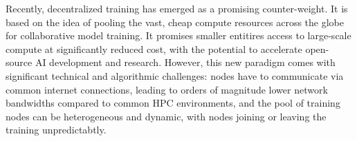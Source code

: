 \documentclass[conference, 10pt]{IEEEtran}
\begin{document}

Recently, decentralized training has emerged as a promising counter-weight. It
is based on the idea of pooling the vast, cheap compute resources across the
globe for collaborative model training. It promises smaller entitires access to
large-scale compute at significantly reduced cost, with the potential to
accelerate open-source AI development and research. However, this new paradigm
comes with significant technical and algorithmic challenges: nodes have to
communicate via common internet connections, leading to orders of magnitude
lower network bandwidths compared to common HPC environments, and the pool of
training nodes can be heterogeneous and dynamic, with nodes joining or leaving
the training unpredictabtly. 

\end{document}
